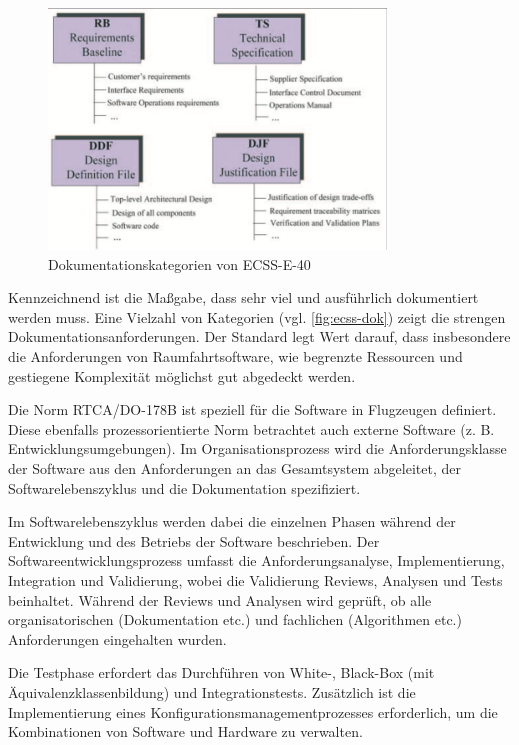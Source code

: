 \begin{figure}
  \centering
  \includegraphics[width=0.8\textwidth]{img/ecss-dokumentation.png}
  \caption{Dokumentationskategorien von ECSS-E-40 \parencite[][S. 136]{jones2002introducing}}
  \label{fig:ecss-dok}
\end{figure}

Kennzeichnend ist die Maßgabe, dass sehr viel und ausführlich dokumentiert werden muss.
Eine Vielzahl von Kategorien (vgl. \autoref{fig:ecss-dok}) zeigt die strengen Dokumentationsanforderungen.
Der Standard legt Wert darauf, dass insbesondere die Anforderungen von Raumfahrtsoftware, wie begrenzte Ressourcen und gestiegene Komplexität möglichst gut abgedeckt werden.
\parencite[Vgl.][]{jones2002introducing}

Die Norm RTCA/DO-178B ist speziell für die Software in Flugzeugen definiert.
Diese ebenfalls prozessorientierte Norm betrachtet auch externe Software (z. B. Entwicklungsumgebungen).
Im Organisationsprozess wird die Anforderungsklasse der Software aus den Anforderungen an das Gesamtsystem abgeleitet, der Softwarelebenszyklus und die Dokumentation spezifiziert.
\parencite[Vgl.][S. 71]{Hohler:1998aa}

Im Softwarelebenszyklus werden dabei die einzelnen Phasen während der Entwicklung und des Betriebs der Software beschrieben.
Der Softwareentwicklungsprozess umfasst die Anforderungsanalyse, Implementierung, Integration und Validierung, wobei die Validierung Reviews, Analysen und Tests beinhaltet.
Während der Reviews und Analysen wird geprüft, ob alle organisatorischen (Dokumentation etc.) und fachlichen (Algorithmen etc.) Anforderungen eingehalten wurden.
\parencite[Vgl.][S. 71]{Hohler:1998aa}

Die Testphase erfordert das Durchführen von White-, Black-Box (mit Äquivalenzklassenbildung) und Integrationstests.
Zusätzlich ist die Implementierung eines Konfigurationsmanagementprozesses erforderlich, um die Kombinationen von Software und Hardware zu verwalten.
\parencite[Vgl.][S. 71]{Hohler:1998aa}

